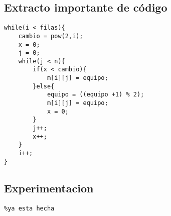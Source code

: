 \documentclass[10pt,a4paper]{article}
\begin{document}
\subsection{Extracto importante de código}
\begin{lstlisting}
while(i < filas){
	cambio = pow(2,i);
	x = 0;
	j = 0;
	while(j < n){
		if(x < cambio){
			m[i][j] = equipo;
		}else{
			equipo = ((equipo +1) % 2);
			m[i][j] = equipo;
			x = 0;
		}
		j++;
		x++;
	}
	i++;
}
\end{lstlisting}

\subsection{Experimentacion}
\begin{verbatim}
%ya esta hecha
\end{verbatim}
\end{document}
